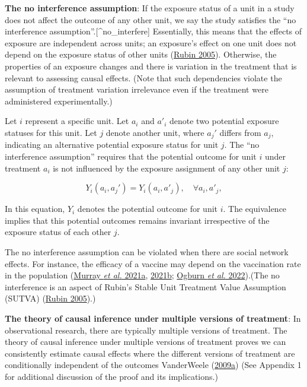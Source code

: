 \documentclass[
  singlecolumn]{article}
\begin{document}
\textbf{The no interference assumption}: If the exposure status of a
unit in a study does not affect the outcome of any other unit, we say
the study satisfies the ``no interference
assumption''.{[}\^{}no\_interfere{]} Essentially, this means that the
effects of exposure are independent across units; an exposure's effect
on one unit does not depend on the exposure status of other units
(\protect\hyperlink{ref-rubin2005}{Rubin 2005}). Otherwise, the
properties of an exposure changes and there is variation in the
treatment that is relevant to assessing causal effects. (Note that such
dependencies violate the assumption of treatment variation irrelevance
even if the treatment were administered experimentally.)

Let \(i\) represent a specific unit. Let \(a_i\) and \(a'_i\) denote two
potential exposure statuses for this unit. Let \(j\) denote another
unit, where \(a_j'\) differs from \(a_j\), indicating an alternative
potential exposure status for unit \(j\). The ``no interference
assumption'' requires that the potential outcome for unit \(i\) under
treatment \(a_i\) is not influenced by the exposure assignment of any
other unit \(j\):

\[
Y_i(a_i, a_j') = Y_i(a_i, a'_j), \quad \forall a_i, a'_j,
\]

In this equation, \(Y_i\) denotes the potential outcome for unit \(i\).
The equivalence implies that this potential outcomes remains invariant
irrespective of the exposure status of each other \(j\).

The no interference assumption can be violated when there are social
network effects. For instance, the efficacy of a vaccine may depend on
the vaccination rate in the population
(\protect\hyperlink{ref-murray2021}{Murray \emph{et al.} 2021a},
\protect\hyperlink{ref-murray2021a}{2021b};
\protect\hyperlink{ref-ogburn2022}{Ogburn \emph{et al.} 2022}).(The no
interference is an aspect of Rubin's Stable Unit Treatment Value
Assumption (SUTVA) (\protect\hyperlink{ref-rubin2005}{Rubin 2005}).)

\textbf{The theory of causal inference under multiple versions of
treatment}: In observational research, there are typically multiple
versions of treatment. The theory of causal inference under multiple
versions of treatment proves we can consistently estimate causal effects
where the different versions of treatment are conditionally independent
of the outcomes VanderWeele
(\protect\hyperlink{ref-vanderweele2009}{2009a}) (See Appendix 1 for
additional discussion of the proof and its implications.)
\end{document}

